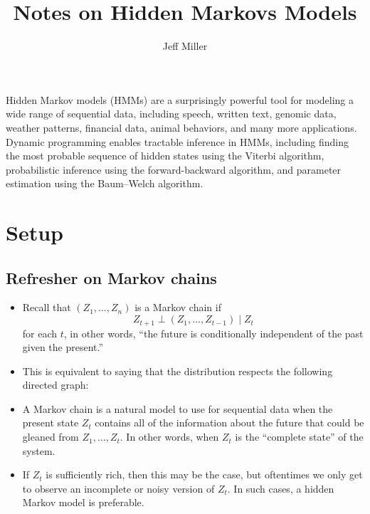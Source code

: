 \documentclass[12pt]{article}
\title{Notes on Hidden Markovs Models}
\author{Jeff Miller}
\begin{document}
\maketitle

\tableofcontents



\vspace{2em}


Hidden Markov models (HMMs) are a surprisingly powerful tool for modeling a wide range of sequential data, including speech, written text, genomic data, weather patterns, financial data, animal behaviors, and many more applications. Dynamic programming enables tractable inference in HMMs, including finding the most probable sequence of hidden states using the Viterbi algorithm, probabilistic inference using the forward-backward algorithm, and parameter estimation using the Baum--Welch algorithm.

\newpage

\section{Setup}

\subsection{Refresher on Markov chains}
\begin{itemize}
\item Recall that $(Z_1,\ldots,Z_n)$ is a Markov chain if
$$ Z_{t +1} \perp (Z_1,\ldots,Z_{t -1}) \mid Z_t $$
for each $t$, in other words, ``the future is conditionally independent of the past given the present.''
\item This is equivalent to saying that the distribution respects the following directed graph:

\item A Markov chain is a natural model to use for sequential data when the present state $Z_t$ contains all of the information about the future that could be gleaned from $Z_1,\ldots,Z_t$. In other words, when $Z_t$ is the ``complete state'' of the system.
\item If $Z_t$ is sufficiently rich, then this may be the case, but oftentimes we only get to observe an incomplete or noisy version of $Z_t$. In such cases, a hidden Markov model is preferable.
\end{itemize}
\end{document}

